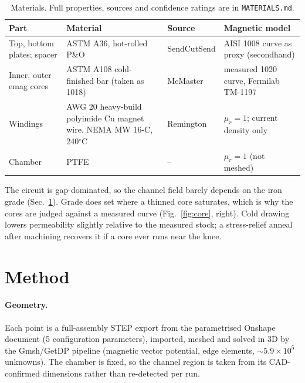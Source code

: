 \documentclass[10pt]{article}
\begin{document}
\begin{table}[htbp]
\centering\small
\begin{tabular}{@{}>{\raggedright}p{3.3cm}>{\raggedright}p{4.3cm}>{\raggedright}p{2.0cm}>{\raggedright\arraybackslash}p{5.2cm}@{}}
\toprule
Part & Material & Source & Magnetic model \\
\midrule
Top, bottom plates; spacer & ASTM A36, hot-rolled P\&O & SendCutSend & AISI 1008 curve as proxy (secondhand) \\
Inner, outer emag cores & ASTM A108 cold-finished bar (taken as 1018) & McMaster & measured 1020 curve, Fermilab TM-1197 \\
Windings & AWG 20 heavy-build polyimide Cu magnet wire, NEMA MW 16-C, 240$^\circ$C & Remington & $\mu_r=1$; current density only \\
Chamber & PTFE & -- & $\mu_r=1$ (not meshed) \\
\bottomrule
\end{tabular}
\caption{Materials. Full properties, sources and confidence ratings are in \texttt{MATERIALS.md}.}
\label{tab:materials}
\end{table}

The circuit is gap-dominated, so the channel field barely depends on the iron grade (Sec.~\ref{sec:method}). Grade does set where a thinned core saturates, which is why the cores are judged against a measured curve (Fig.~\ref{fig:core}, right). Cold drawing lowers permeability slightly relative to the measured stock; a stress-relief anneal after machining recovers it if a core ever runs near the knee.

\section{Method}
\label{sec:method}

\paragraph{Geometry.} Each point is a full-assembly STEP export from the parametrised Onshape document (5 configuration parameters), imported, meshed and solved in 3D by the Gmsh/GetDP pipeline (magnetic vector potential, edge elements, ${\sim}5.9\times10^5$ unknowns). The chamber is fixed, so the channel region is taken from its CAD-confirmed dimensions rather than re-detected per run.
\end{document}
